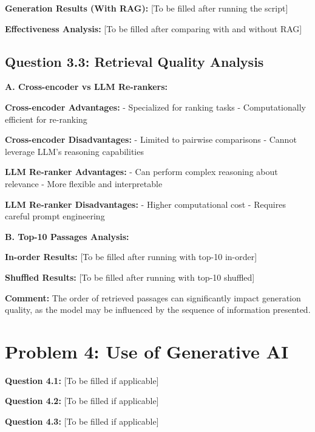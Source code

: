 \documentclass[11pt]{article}
\begin{document}
\textbf{Generation Results (With RAG):} [To be filled after running the script]

\textbf{Effectiveness Analysis:} [To be filled after comparing with and without RAG]

\subsection{Question 3.3: Retrieval Quality Analysis}

\textbf{A. Cross-encoder vs LLM Re-rankers:}

\textbf{Cross-encoder Advantages:}
- Specialized for ranking tasks
- Computationally efficient for re-ranking

\textbf{Cross-encoder Disadvantages:}
- Limited to pairwise comparisons
- Cannot leverage LLM's reasoning capabilities

\textbf{LLM Re-ranker Advantages:}
- Can perform complex reasoning about relevance
- More flexible and interpretable

\textbf{LLM Re-ranker Disadvantages:}
- Higher computational cost
- Requires careful prompt engineering

\textbf{B. Top-10 Passages Analysis:}

\textbf{In-order Results:} [To be filled after running with top-10 in-order]

\textbf{Shuffled Results:} [To be filled after running with top-10 shuffled]

\textbf{Comment:} The order of retrieved passages can significantly impact generation quality, as the model may be influenced by the sequence of information presented.

\section{Problem 4: Use of Generative AI}

\textbf{Question 4.1:} [To be filled if applicable]

\textbf{Question 4.2:} [To be filled if applicable]

\textbf{Question 4.3:} [To be filled if applicable]
\end{document}
